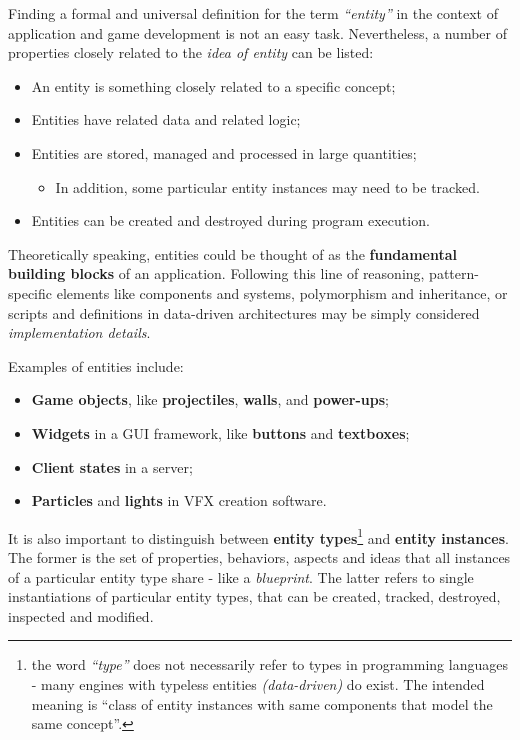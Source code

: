 \documentclass[oneside, 12pt, a4paper, openany]{book}
\providecommand{\tightlist}{%
  \setlength{\itemsep}{0pt}\setlength{\parskip}{0pt}}
\begin{document}
Finding a formal and universal definition for the term \emph{``entity''}
in the context of application and game development is not an easy task.
Nevertheless, a number of properties closely related to the \emph{idea
of entity} can be listed:

\begin{itemize}
\item
  An entity is something closely related to a specific concept;
\item
  Entities have related data and related logic;
\item
  Entities are stored, managed and processed in large quantities;

  \begin{itemize}
  \tightlist
  \item
    In addition, some particular entity instances may need to be
    tracked.
  \end{itemize}
\item
  Entities can be created and destroyed during program execution.
\end{itemize}

Theoretically speaking, entities could be thought of as the
\textbf{fundamental building blocks} of an application. Following this
line of reasoning, pattern-specific elements like components and
systems, polymorphism and inheritance, or scripts and definitions in
data-driven architectures may be simply considered \emph{implementation
details}.

Examples of entities include:

\begin{itemize}
\item
  \textbf{Game objects}, like \textbf{projectiles}, \textbf{walls}, and
  \textbf{power-ups};
\item
  \textbf{Widgets} in a GUI framework, like \textbf{buttons} and
  \textbf{textboxes};
\item
  \textbf{Client states} in a server;
\item
  \textbf{Particles} and \textbf{lights} in VFX creation software.
\end{itemize}

It is also important to distinguish between \textbf{entity
types}\footnote{the word \emph{``type''} does not necessarily refer to
  types in programming languages - many engines with typeless entities
  \emph{(data-driven)} do exist. The intended meaning is ``class of
  entity instances with same components that model the same concept''.}
and \textbf{entity instances}. The former is the set of properties,
behaviors, aspects and ideas that all instances of a particular entity
type share - like a \emph{blueprint}. The latter refers to single
instantiations of particular entity types, that can be created, tracked,
destroyed, inspected and modified.
\end{document}
